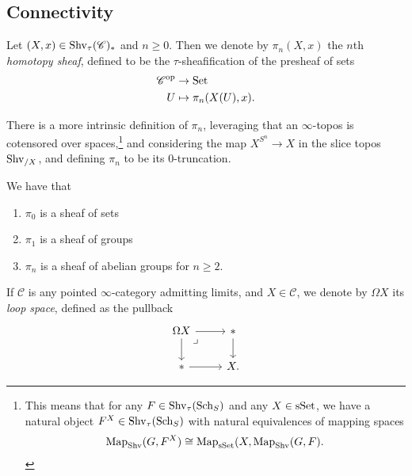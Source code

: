 \documentclass[11pt,openany]{book}
\begin{document}
\subsection{Connectivity}



\begin{definition} Let $(X,x)\in\mathrm{Shv}_\tau(\mathscr{C})_\ast$ and $n\ge0$. Then we denote by $\pi_n(X,x)$ the $n$th \textit{homotopy sheaf}, defined to be the $\tau$-sheafification of the presheaf of sets
\begin{align*}
    \mathscr{C}^{\mathrm{op}} &\to \mathrm{Set} \\
    U &\mapsto \pi_n(X(U),x).
\end{align*}
\end{definition}

\begin{remark} There is a more intrinsic definition of $\pi_n$, leveraging that an $\infty$-topos is cotensored over spaces,\footnote{%
This means that for any $F \in \mathrm{Shv}_\tau(\mathrm{Sch}_S)$ and any $X \in \mathrm{sSet}$, we have a natural object $F^X\in \mathrm{Shv}_\tau(\mathrm{Sch}_S)$ with natural equivalences of mapping spaces
\begin{align*}
    \mathrm{Map}_{\mathrm{Shv}}(G,F^X) \cong \mathrm{Map}_{\mathrm{sSet}}(X,\mathrm{Map}_{\mathrm{Shv}}(G,F).
\end{align*}
}
and considering the map $X^{S^n} \to X$ in the slice topos $\mathrm{Shv}_{/X}$, and defining $\pi_n$ to be its 0-truncation.
\end{remark}


\begin{proposition} We have that
\begin{enumerate}
    \item $\pi_0$ is a sheaf of sets
    \item $\pi_1$ is a sheaf of groups
    \item $\pi_n$ is a sheaf of abelian groups for $n\ge 2$.
\end{enumerate}
\end{proposition}

\begin{notation} If $\mathscr{C}$ is any pointed $\infty$-category admitting limits, and $X\in \mathscr{C}$, we denote by $\Omega X$ its \textit{loop space}, defined as the pullback
\[ \begin{tikzcd}
    \Omega X\rar\dar\pb & \ast\dar\\
    \ast\rar & X.
\end{tikzcd} \]
\end{notation}
\end{document}
